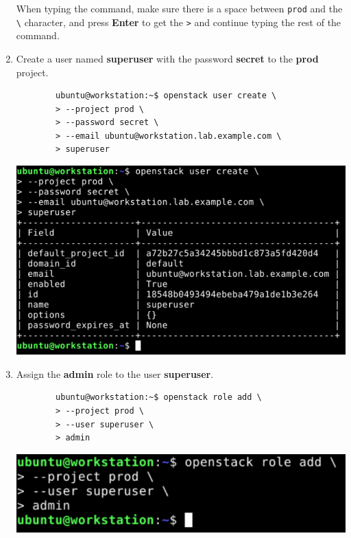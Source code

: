 \documentclass[letterpaper, 12pt]{article}
\begin{document}
\begin{enumerate}
    \begin{tipbox}
        When typing the command, make sure there is a space between \texttt{prod} and the \texttt{\textbackslash}
        character, and press \textbf{Enter} to get the \texttt{>} and continue typing the rest of the command.
    \end{tipbox}

    \item Create a user named \textbf{superuser} with the password \textbf{secret} to the \textbf{prod} project.
    \begin{lstlisting}
        ubuntu@workstation:~$ openstack user create \
        > --project prod \
        > --password secret \
        > --email ubuntu@workstation.lab.example.com \
        > superuser
    \end{lstlisting}

    \begin{center}
        \includegraphics[width=\linewidth]{images/part1/step5.png}
    \end{center}

    \item Assign the \textbf{admin} role to the user \textbf{superuser}.
    \begin{lstlisting}
        ubuntu@workstation:~$ openstack role add \
        > --project prod \
        > --user superuser \
        > admin
    \end{lstlisting}

    \begin{center}
        \includegraphics[width=\linewidth]{images/part1/step6.png}
    \end{center}


\end{enumerate}
\end{document}

